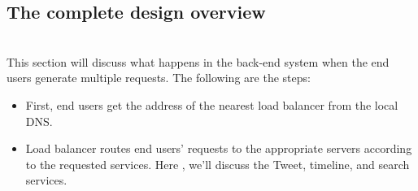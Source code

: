 \subsection{The complete design overview}\label{sPSJCPiUm_7Cr-_cl6Hj_}
\\
This section will discuss what happens in the back-end system when the end users generate multiple requests. The following are the steps:

\begin{itemize}
\item
\protect{}\label{SixhDIW7q-S2FH1orDNGA}
First, end users get the address of the nearest load balancer from the local DNS.
\item
\protect{}\label{V_xrW_1cM2XESUhBc2PBk}
Load balancer routes end users' requests to the appropriate servers according to the requested services. Here , we'll discuss the Tweet, timeline, and search services.


\end{itemize}
